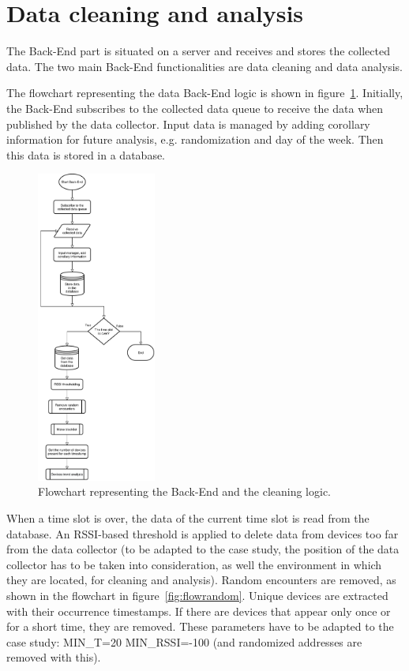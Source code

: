 \section{Data cleaning and analysis}
\label{sec:analysis}
\vspace{0.2 cm} 

The Back-End part is situated on a server and receives and stores the collected data. The two main Back-End functionalities are data cleaning and data analysis.

The flowchart representing the data Back-End logic is shown in figure~\ref{fig:flowcleaner}. Initially, the Back-End subscribes to the collected data queue to receive the data when published by the data collector. Input data is managed by adding corollary information for future analysis, e.g. randomization and day of the week. Then this data is stored in a database.

\begin{figure}[h]
\centering 
\includegraphics[width=0.35\textwidth]{images/flowcleaner} 
\caption{Flowchart representing the Back-End and the cleaning logic.}
\label{fig:flowcleaner}
\end{figure}

When a time slot is over, the data of the current time slot is read from the database. An RSSI-based threshold is applied to delete data from devices too far from the data collector (to be adapted to the case study, the position of the data collector has to be taken into consideration, as well the environment in which they are located, for cleaning and analysis). Random encounters are removed, as shown in the flowchart in figure~\ref{fig:flowrandom}. Unique devices are extracted with their occurrence timestamps. If there are devices that appear only once or for a short time, they are removed. These parameters have to be adapted to the case study: MIN\_T=20 MIN\_RSSI=-100 (and randomized addresses are removed with this).

